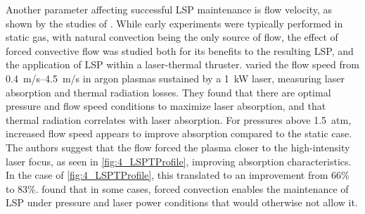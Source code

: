         Another parameter affecting successful LSP maintenance is flow velocity, as shown by the studies of \textcite{welleEnergyConversionEfficiency1986,krierContinuousWaveLaser1986,gerasimenkoLaserPlasmatron1983}. While early experiments were typically performed in static gas, with natural convection being the only source of flow, the effect of forced convective flow was studied both for its benefits to the resulting LSP, and the application of LSP within a laser-thermal thruster. \citeauthor{welleEnergyConversionEfficiency1986} varied the flow speed from \qtyrange{0.4}{4.5}{m/s} in argon plasmas sustained by a 1~kW laser, measuring laser absorption and thermal radiation losses. They found that there are optimal pressure and flow speed conditions to maximize laser absorption, and that thermal radiation correlates with laser absorption. For pressures above 1.5~atm, increased flow speed appears to improve absorption compared to the static case. The authors suggest that the flow forced the plasma closer to the high-intensity laser focus, as seen in \autoref{fig:4_LSPTProfile}, improving absorption characteristics. In the case of \autoref{fig:4_LSPTProfile}, this translated to an improvement from 66\% to 83\%. \citeauthor{gerasimenkoLaserPlasmatron1983} found that in some cases, forced convection enables the maintenance of LSP under pressure and laser power conditions that would otherwise not allow it.


